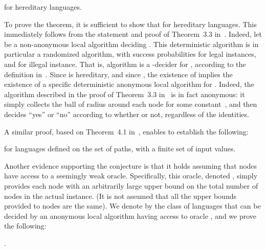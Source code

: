 \documentclass{llncs}
\begin{document}
\begin{theorem}\label{theo:LDhereditary}
 for hereditary languages. 
\end{theorem}

To prove the theorem, it is sufficient to show that  for hereditary languages. This immediately follows from the statement and proof of Theorem~3.3 in~\cite{FKP11}. Indeed, let  be a non-anonymous local algorithm deciding . This deterministic algorithm is in particular a randomized algorithm, with success probabilities  for legal instances, and  for illegal instance. That is, algorithm  is a -decider for , according to the  definition in~\cite{FKP11}. Since  is hereditary, and since , the existence of  implies the existence of a specific deterministic anonymous local algorithm  for . Indeed, the algorithm  described in the proof of Theorem~3.3 in~\cite{FKP11}  is in fact anonymous: it simply collects the ball  of radius  around each node  for some constant~, and  then decides ``yes'' or ``no'' according to whether  or not, regardless of the identities. 

A similar proof, based on Theorem~4.1 in~\cite{FKPP12}, enables to establish the following: 

\begin{theorem}\label{theo:LDpath}
 for languages defined on the set of paths, with a finite set of input values. 
\end{theorem}

Another evidence supporting the conjecture  is that it holds assuming that nodes have access to a seemingly weak oracle. Specifically, this oracle, denoted , simply provides each node with an arbitrarily large upper bound on the total number of nodes in the actual instance. 
(It is not assumed that all the upper bounds provided to nodes are the same). We denote by  the class of languages that can be decided by an anonymous local algorithm having access to oracle , and we prove the following: 

\begin{theorem}\label{theo:LD=LD}
.
\end{theorem}
\end{document}
